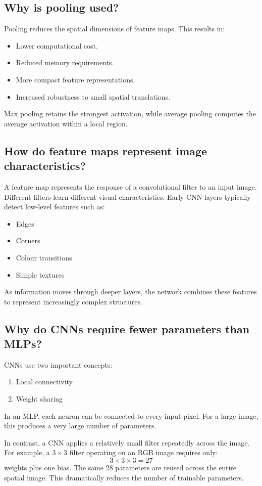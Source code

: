 \documentclass[11pt]{article}
\begin{document}
\subsection{Why is pooling used?}
Pooling reduces the spatial dimensions of feature maps. This results in:
\begin{itemize}
    \item Lower computational cost.
    \item Reduced memory requirements.
    \item More compact feature representations.
    \item Increased robustness to small spatial translations.
\end{itemize}
Max pooling retains the strongest activation, while average pooling computes the average activation within a local region.

\subsection{How do feature maps represent image characteristics?}
A feature map represents the response of a convolutional filter to an input image. Different filters learn different visual characteristics. Early CNN layers typically detect low-level features such as:
\begin{itemize}
    \item Edges
    \item Corners
    \item Colour transitions
    \item Simple textures
\end{itemize}
As information moves through deeper layers, the network combines these features to represent increasingly complex structures.

\subsection{Why do CNNs require fewer parameters than MLPs?}
CNNs use two important concepts:
\begin{enumerate}
    \item Local connectivity
    \item Weight sharing
\end{enumerate}
In an MLP, each neuron can be connected to every input pixel. For a large image, this produces a very large number of parameters.

In contrast, a CNN applies a relatively small filter repeatedly across the image. For example, a $3 \times 3$ filter operating on an RGB image requires only:
\[
3 \times 3 \times 3 = 27
\]
weights plus one bias. The same 28 parameters are reused across the entire spatial image. This dramatically reduces the number of trainable parameters.
\end{document}
